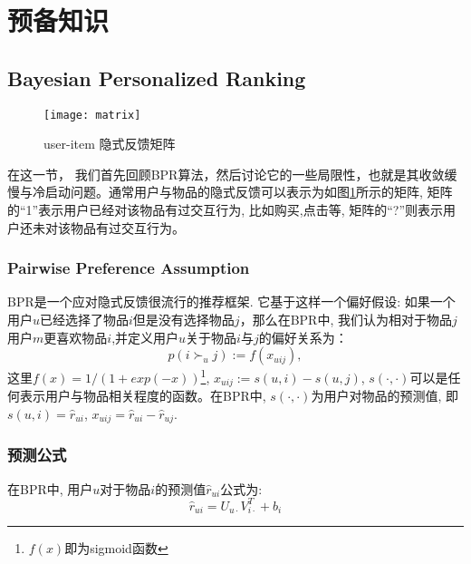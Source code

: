 \section{预备知识}

\subsection{Bayesian Personalized Ranking}
\begin{figure}[htbp]
	\begin{center}
		\texttt{[image: matrix]}
		\caption{user-item 隐式反馈矩阵}
		\label{gra3}
	\end{center}
\end{figure}
在这一节， 我们首先回顾BPR算法，然后讨论它的一些局限性，也就是其收敛缓慢与冷启动问题。通常用户与物品的隐式反馈可以表示为如图\ref{gra3}所示的矩阵, 矩阵的“1”表示用户已经对该物品有过交互行为, 比如购买,点击等, 矩阵的“?”则表示用户还未对该物品有过交互行为。

\subsubsection{Pairwise Preference Assumption}
BPR\cite{rendle2009bpr}是一个应对隐式反馈很流行的推荐框架. 它基于这样一个偏好假设: 如果一个用户$u$已经选择了物品$i$但是没有选择物品$j$，那么在BPR中, 我们认为相对于物品$j$用户$m$更喜欢物品$i$,并定义用户$u$关于物品$i$与$j$的偏好关系为：
\begin{equation}
\label{pairwisepre}
p \left( i \succ_u j \right) := f \left( x_{uij} \right),
\end{equation}
这里$f \left(x\right) = 1/\left(1+exp\left(-x\right)\right)$\footnote{$f \left(x\right)$即为sigmoid函数}, $x_{uij} := s\left(u,i\right) - s\left(u,j\right)$, $s\left(\cdot,\cdot\right)$可以是任何表示用户与物品相关程度的函数。在BPR\cite{rendle2009bpr}中, $s\left(\cdot,\cdot\right)$为用户对物品的预测值, 即$s\left(u,i\right) = \hat{r}_{ui}$, $x_{uij} = \hat{r}_{ui}-\hat{r}_{uj}$.


\subsubsection{预测公式}

在BPR中, 用户$u$对于物品$i$的预测值$\hat{r}_{ui}$公式为:
\begin{equation}
\hat{r}_{ui} = U_{u\cdot}V_{i\cdot}^T + b_i
\end{equation}


